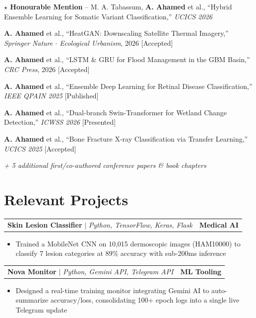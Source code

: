 \documentclass[11pt,a4paper]{article}
\makeatletter
\newcommand{\projectHeading}[3]{
  \vspace{4pt}
  \noindent
  \begin{tabular*}{\textwidth}{@{}l@{\extracolsep{\fill}}r@{}}
    \textbf{#1} $|$ \textit{#2} & \textbf{#3} \\
  \end{tabular*}
}
\makeatother
\begin{document}
\begin{enumerate}[label={[\arabic*]}, leftmargin=1.5em]
    \item \textbf{$\star$ Honourable Mention} -- M. A. Tabassum, \textbf{A. Ahamed} et al., ``Hybrid Ensemble Learning for Somatic Variant Classification,'' \textit{UCICS 2026}

    \item \textbf{A. Ahamed} et al., ``HeatGAN: Downscaling Satellite Thermal Imagery,'' \textit{Springer Nature $\cdot$ Ecological Urbanism}, 2026 [Accepted]

    \item \textbf{A. Ahamed} et al., ``LSTM \& GRU for Flood Management in the GBM Basin,'' \textit{CRC Press}, 2026 [Accepted]

    \item \textbf{A. Ahamed} et al., ``Ensemble Deep Learning for Retinal Disease Classification,'' \textit{IEEE QPAIN 2025} [Published]

    \item \textbf{A. Ahamed} et al., ``Dual-branch Swin-Transformer for Wetland Change Detection,'' \textit{ICWSS 2026} [Presented]

    \item \textbf{A. Ahamed} et al., ``Bone Fracture X-ray Classification via Transfer Learning,'' \textit{UCICS 2025} [Accepted]

    {\small \textit{+ 5 additional first/co-authored conference papers \& book chapters}}
\end{enumerate}

\section*{Relevant Projects}

\projectHeading{Skin Lesion Classifier}{Python, TensorFlow, Keras, Flask}{Medical AI}
\begin{itemize}
    \item Trained a MobileNet CNN on 10,015 dermoscopic images (HAM10000) to classify 7 lesion categories at 89\% accuracy with sub-200ms inference
\end{itemize}

\projectHeading{Nova Monitor}{Python, Gemini API, Telegram API}{ML Tooling}
\begin{itemize}
    \item Designed a real-time training monitor integrating Gemini AI to auto-summarize accuracy/loss, consolidating 100+ epoch logs into a single live Telegram update
\end{itemize}
\end{document}
